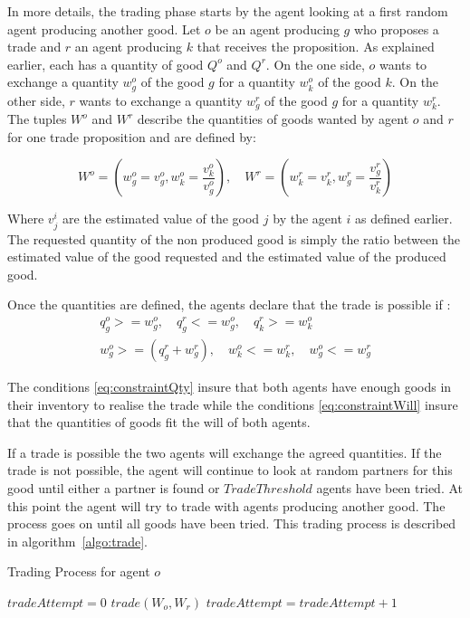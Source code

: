 \documentclass{wscpaperproc}
\begin{document}
In more details, the trading phase starts by the agent looking at a first random agent producing another good. 
Let $o$ be an agent producing $g$ who proposes a trade and $r$ an agent producing $k$ that receives the proposition. As explained earlier, each has a quantity of good $Q^o$ and $Q^r$. On the one side, $o$ wants to exchange a quantity $w_g^o$ of the good $g$ for a quantity $w_k^o$ of the good $k$. On the other side, $r$ wants to exchange a quantity $w_g^r$ of the good $g$ for a quantity $w_k^r$. The tuples $W^o$ and $W^r$ describe the quantities of goods wanted by agent $o$ and $r$ for one trade proposition and are defined by:  

\begin{equation}
	 W^o=(w_g^o = v_g^o,w_k^o= \frac{v_k^o}{v_g^o}), \quad
	 W^r=(w_k^r = v_k^r,w_g^r= \frac{v_g^r}{v_k^r}) 
	 \label{eq:trade}
\end{equation}

 Where $v_j^i$ are the estimated value of the good $j$ by the agent $i$ as defined earlier. 
The requested quantity of the non produced good is simply the ratio between the estimated value of the good requested and the estimated value of the produced good.


Once the quantities are defined, the agents declare that the trade is possible if :
\begin{align}
q_g^o >= w_g^o,\quad q_g^r <= w_g^o,\quad q_k^r >= w_k^o \label{eq:constraintQty}\\
w_g^o>=(q_g^r+w_g^r),\quad w_k^o<=w_k^r,\quad w_g^o<=w_g^r \label{eq:constraintWill}
\end{align}


The conditions \ref{eq:constraintQty} insure that both agents have enough goods in their inventory to realise the trade while the conditions \ref{eq:constraintWill} insure that the quantities of goods fit the will of both agents.



If a trade is possible the two agents will exchange the agreed quantities. If the trade is not possible, the agent will continue to look at random partners for this good until either a partner is found or $TradeThreshold$ agents have been tried. At this point the agent will try to trade with agents producing another good. The process goes on until all goods have been tried. This trading process is described in algorithm~\ref{algo:trade}.

\begin{algorithm}
\caption{Trading Process for agent $o$}
\label{algo:trade}
	\begin{algorithmic}[1]
	\scriptsize
			\State $tradeAttempt = 0$
					\State $trade(W_o,W_r)$
				\Else
					\State $tradeAttempt = tradeAttempt + 1$					
				\EndIf
			\EndFor
		\EndFor
\end{algorithmic}
\end{algorithm}
\end{document}
